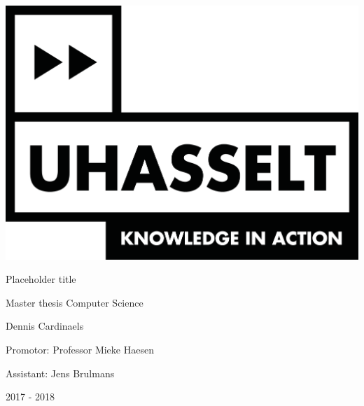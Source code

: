 \documentclass{article}
\begin{document}
	\begin{titlepage}

		\centering
		
		
		\includegraphics[scale=0.5]{logo_uhasselt}		
		\vspace{1cm}
		
		\Huge Placeholder title
		\vspace{0.4cm}
		
		\large Master thesis Computer Science
		\vspace{1cm}
		
		\LARGE Dennis Cardinaels
		\vspace{1cm}
		
		\large Promotor: Professor Mieke Haesen
		\vspace{0.2cm}
		
		Assistant: Jens Brulmans
		
		\vspace{1.2cm}
		
		
		\Large 2017 - 2018
		
	\end{titlepage}

	\cleardoublepage
	
	
	
	
	
	\tableofcontents
	\newpage
	
	
	
	
	

	

	

	

	
	
	
\end{document}
